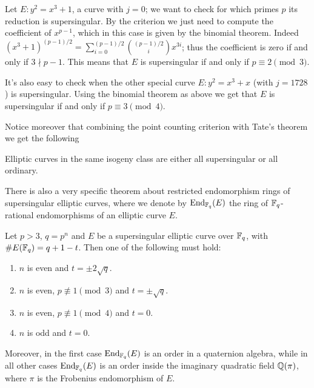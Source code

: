 \begin{example}
    Let $E:y^2=x^3+1$, a curve with $j=0$; we want to check for which primes $p$ its reduction is supersingular. By the criterion we just need to compute the coefficient of $x^{p-1}$, which in this case is given by the binomial theorem. Indeed $(x^3+1)^{(p-1)/2}=\sum_{i=0}^{(p-1)/2}\binom{(p-1)/2}{i}x^{3i}$; thus the coefficient is zero if and only if $3\nmid p-1$. This means that $E$ is supersingular if and only if $p\equiv2\pmod 3$.
\end{example}

\begin{example}
    It's also easy to check when the other special curve $E: y^2=x^3+x$ (with $j=1728$) is supersingular. Using the binomial theorem as above we get that $E$ is supersingular if and only if $p\equiv3\pmod4$.
\end{example}

Notice moreover that combining the point counting criterion with Tate's theorem we get the following
\begin{remark}
    Elliptic curves in the same isogeny class are either all supersingular or all ordinary.
\end{remark}

There is also a very specific theorem about restricted endomorphism rings of supersingular elliptic curves, where we denote by $\operatorname{End}_{\mathbb{F}_q}(E)$ the ring of $\mathbb{F}_q$-rational endomorphisms of an elliptic curve $E$.
\begin{theorem}\label{thm_endfp}
    Let $p>3$, $q=p^n$ and $E$ be a supersingular elliptic curve over $\mathbb{F}_q$, with $\# E(\mathbb{F}_q)=q+1-t$. Then one of the following must hold:
    \begin{enumerate}
        \item $n$ is even and $t=\pm2\sqrt{q}$.
        \item $n$ is even, $p\not\equiv1\pmod 3$ and $t=\pm\sqrt{q}$.
        \item $n$ is even, $p\not\equiv1\pmod 4$ and $t=0$.
        \item $n$ is odd and $t=0$.
    \end{enumerate}

    Moreover, in the first case $\operatorname{End}_{\mathbb{F}_q}(E)$ is an order in a quaternion algebra, while in all other cases $\operatorname{End}_{\mathbb{F}_q}(E)$ is an order inside the imaginary quadratic field $\mathbb{Q}(\pi)$, where $\pi$ is the Frobenius endomorphism of $E$.
\end{theorem}

